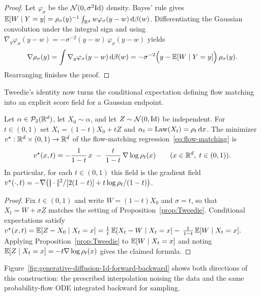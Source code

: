 \begin{proof}
Let $\varphi_\sigma$ be the $\mathcal{N}(0,\sigma^{2}\mathrm{Id})$ density. Bayes' rule gives \(\mathbb{E}[W\mid Y=y]=\rho_\sigma(y)^{-1}\int_{\mathbb{R}^{d}} w\varphi_\sigma(y-w)\,\mathrm{d}\beta(w)\).
Differentiating the Gaussian convolution under the integral sign and using
$
\nabla_y\varphi_\sigma(y-w)
     = -\sigma^{-2}(y-w)\,\varphi_\sigma(y-w)
$
yields
\[
\nabla\rho_\sigma(y)
= \int \nabla_y\varphi_\sigma(y-w)\,\mathrm{d}\beta(w)
= -\sigma^{-2}\Bigl(y-\mathbb{E}[W\mid Y=y]\Bigr)\,\rho_\sigma(y).
\]
Rearranging finishes the proof.
\end{proof}


Tweedie's identity now turns the conditional expectation defining flow matching into an explicit score field for a Gaussian endpoint.

\begin{proposition}\label{prop:flow}
Let \(\alpha\in\mathcal{P}_2(\mathbb{R}^d)\), let $X_0\sim\alpha$, and let $Z\sim\mathcal{N}(0,\mathrm{Id})$ be independent.
For $t\in(0,1)$ set \(X_t=(1-t)X_0+tZ\) and \(\alpha_t=\operatorname{Law}(X_t)=\rho_t\,\mathrm{d} x\). The minimizer $v^\star:\mathbb{R}^d\times(0,1)\to\mathbb{R}^d$ of the flow-matching regression~\eqref{eq:flow-matching} is
\[
v^\star(x,t)
= -\frac{1}{1-t}\,x \;-\; \frac{t}{1-t}\,\nabla\log\rho_t(x)
\qquad (x\in\mathbb{R}^{d},\;t\in(0,1)).
\]
In particular, for each $t\in(0,1)$ this field is the gradient field \(v^\star(\cdot,t)=-\nabla\bigl(|\!| \cdot |\!|^2/[2(1-t)]+t\log\rho_t/(1-t)\bigr)\).
\end{proposition}

\begin{proof}
Fix $t\in(0,1)$ and write $W=(1-t)X_0$ and $\sigma=t$, so that
$X_t=W+\sigma Z$ matches the setting of Proposition~\ref{prop:Tweedie}.
Conditional expectations satisfy
$
v^\star(x,t)
= \mathbb{E}[Z-X_0\mid X_t=x]
= \frac{1}{t}\,\mathbb{E}[X_t-W\mid X_t=x]
  -\,\frac{1}{1-t}\,\mathbb{E}[W\mid X_t=x].
$
Applying Proposition~\ref{prop:Tweedie} to $\mathbb{E}[W\mid X_t=x]$ and
noting $\mathbb{E}[Z\mid X_t=x]=-t\nabla\log\rho_t(x)$
gives the claimed formula.
\end{proof}

Figure~\ref{fig:generative-diffusion-1d-forward-backward} shows both directions of this construction: the prescribed interpolation noising the data and the same probability-flow ODE integrated backward for sampling.

